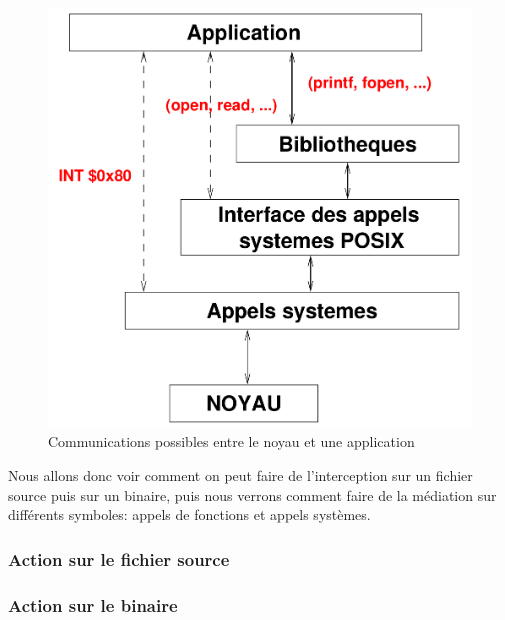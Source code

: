 \begin{figure}[H]
 \centering
 \includegraphics[scale=0.20]{Pictures/Communication_application_noyau.png}
 \caption{Communications possibles entre le noyau et une application}
 \label{AS_Communication}
\end{figure}

Nous allons donc voir comment on peut faire de l'interception sur un fichier source puis sur un binaire, puis nous verrons comment faire de la médiation sur différents symboles: appels de fonctions et appels systèmes.

\subsubsection{Action sur le fichier source}
\subsubsection{Action sur le binaire}

